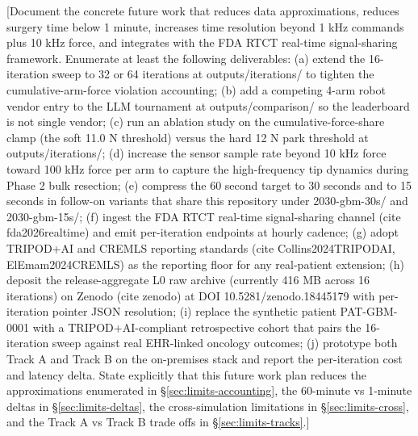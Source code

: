 [Document the concrete future work that reduces data approximations,
reduces surgery time below 1 minute, increases time resolution
beyond 1 kHz commands plus 10 kHz force, and integrates with the FDA
RTCT real-time signal-sharing framework. Enumerate at least the
following deliverables: (a) extend the 16-iteration sweep to 32 or
64 iterations at outputs/iterations/ to tighten the cumulative-arm-force
violation accounting; (b) add a competing 4-arm robot vendor entry
to the LLM tournament at outputs/comparison/ so the leaderboard is
not single vendor; (c) run an ablation study on the
cumulative-force-share clamp (the soft 11.0 N threshold) versus the
hard 12 N park threshold at outputs/iterations/; (d) increase the
sensor sample rate beyond 10 kHz force toward 100 kHz force per arm
to capture the high-frequency tip dynamics during Phase 2 bulk
resection; (e) compress the 60 second target to 30 seconds and to
15 seconds in follow-on variants that share this repository under
2030-gbm-30s/ and 2030-gbm-15s/; (f) ingest the FDA RTCT real-time
signal-sharing channel (cite fda2026realtime) and emit per-iteration
endpoints at hourly cadence; (g) adopt TRIPOD+AI and CREMLS reporting
standards (cite Collins2024TRIPODAI, ElEmam2024CREMLS) as the
reporting floor for any real-patient extension; (h) deposit the
release-aggregate L0 raw archive (currently 416 MB across 16
iterations) on Zenodo (cite zenodo) at DOI 10.5281/zenodo.18445179
with per-iteration pointer JSON resolution; (i) replace the
synthetic patient PAT-GBM-0001 with a TRIPOD+AI-compliant
retrospective cohort that pairs the 16-iteration sweep against real
EHR-linked oncology outcomes; (j) prototype both Track A and Track B
on the on-premises stack and report the per-iteration cost and
latency delta. State explicitly that this future work plan reduces
the approximations enumerated in \S\ref{sec:limits-accounting}, the
60-minute vs 1-minute deltas in \S\ref{sec:limits-deltas}, the
cross-simulation limitations in \S\ref{sec:limits-cross}, and the
Track A vs Track B trade offs in \S\ref{sec:limits-tracks}.]
